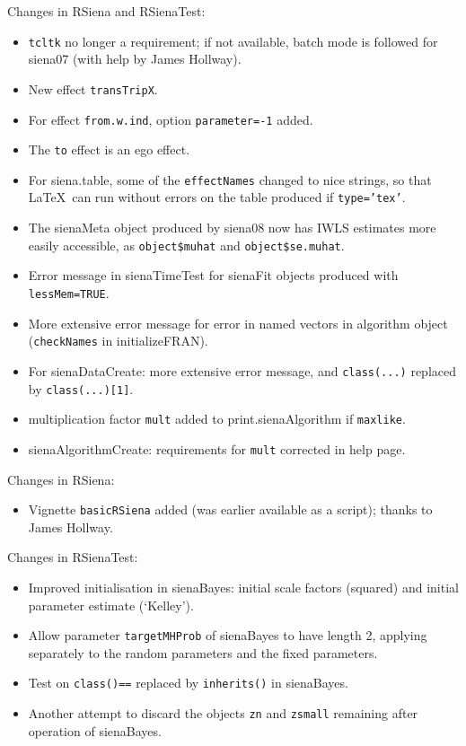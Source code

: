 \documentclass[a4paper,fleqn,11pt]{article}
\newcommand{\+}{\, + \,}
\newcommand{\sfn}[1]{\textsf{#1}}
\begin{document}
\begin{small}
\begin{itemize}
Changes in RSiena and RSienaTest:
\begin{itemize}
   \item \texttt{tcltk} no longer a requirement; if not available,
        batch mode is followed for \sfn{siena07} (with help
        by James Hollway).
   \item New effect \texttt{transTripX}.
   \item For effect \texttt{from.w.ind}, option \texttt{parameter=-1} added.
   \item The \texttt{to} effect is an ego effect.
   \item For \sfn{siena.table}, some of the \texttt{effectNames} changed to nice strings,
     so that \LaTeX\ can run without errors
     on the table produced if \texttt{type='tex'}.
   \item The \sfn{sienaMeta} object produced by \sfn{siena08} now has IWLS estimates more easily
     accessible, as \texttt{object\$muhat} and \texttt{object\$se.muhat}.
   \item Error message in \sfn{sienaTimeTest} for \sfn{sienaFit} objects produced with
     \texttt{lessMem=TRUE}.
   \item More extensive error message for error in named vectors in algorithm object
     (\texttt{checkNames} in \sfn{initializeFRAN}).
   \item For \sfn{sienaDataCreate}: more extensive error message, and \texttt{class(...)} replaced
     by \texttt{class(...)[1]}.
   \item multiplication factor \texttt{mult}
     added to \sfn{print.sienaAlgorithm} if \texttt{maxlike}.
   \item \sfn{sienaAlgorithmCreate}: requirements for \texttt{mult} corrected in help page.
\end{itemize}

Changes in RSiena:
\begin{itemize}
\item Vignette \texttt{basicRSiena} added (was earlier available as a script);
     thanks to James Hollway.
\end{itemize}

Changes in RSienaTest:
\begin{itemize}
   \item Improved initialisation in \sfn{sienaBayes}: initial scale factors (squared)
     and initial parameter estimate (`Kelley').
   \item Allow parameter \texttt{targetMHProb} of \sfn{sienaBayes} to have length 2,
        applying separately to the random parameters and the fixed parameters.
   \item Test on \texttt{class()==} replaced by \texttt{inherits()} in \sfn{sienaBayes}.
   \item Another attempt to discard the objects \texttt{zn} and \texttt{zsmall} remaining after operation
     of \sfn{sienaBayes}.
\end{itemize}





\end{itemize}
\end{small}
\end{document}
